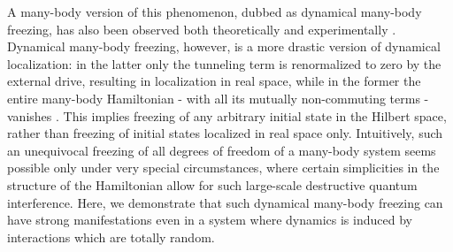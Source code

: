 \documentclass[reprint,preprintnumbers,showpacs,amsmath,twocolumn,showkeys,aps,prl]{revtex4-1}
\begin{document}
A many-body version of this phenomenon, dubbed as dynamical many-body 
freezing, has also been observed both theoretically 
\cite{AD-DQH,SB-AD-SDG,AD-RM,Russomanno,Anatoli-Periodic,Sei-Book} 
and experimentally \cite{DMF-IISER-Exp}. Dynamical many-body freezing, however, is a 
more drastic version of dynamical localization: in the latter only the tunneling term is 
renormalized to zero by the external drive, resulting in 
localization in real space, while in the former the entire many-body Hamiltonian - with all its mutually
non-commuting terms - vanishes \cite{AD-DQH}. This implies 
freezing of any arbitrary initial state in the Hilbert space, rather than freezing of initial 
states localized in real space only. Intuitively, such an unequivocal freezing of all degrees of freedom 
of a many-body system seems possible only under very special circumstances, where certain simplicities in the structure of the Hamiltonian allow for such large-scale destructive quantum interference. Here, we demonstrate that such dynamical 
many-body freezing can have strong manifestations even in a system where dynamics 
is induced by interactions which are totally random.
\end{document}
